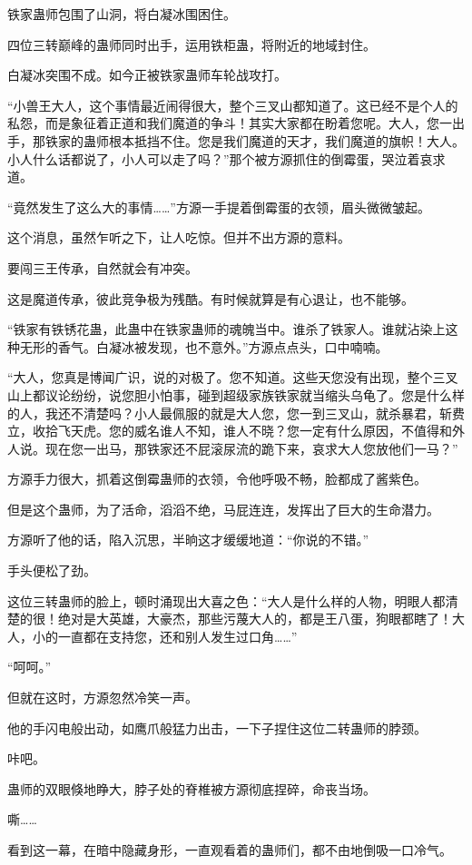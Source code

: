 \begin{this_body}
铁家蛊师包围了山洞，将白凝冰围困住。

四位三转巅峰的蛊师同时出手，运用铁柜蛊，将附近的地域封住。

白凝冰突围不成。如今正被铁家蛊师车轮战攻打。

“小兽王大人，这个事情最近闹得很大，整个三叉山都知道了。这已经不是个人的私怨，而是象征着正道和我们魔道的争斗！其实大家都在盼着您呢。大人，您一出手，那铁家的蛊师根本抵挡不住。您是我们魔道的天才，我们魔道的旗帜！大人。小人什么话都说了，小人可以走了吗？”那个被方源抓住的倒霉蛋，哭泣着哀求道。

“竟然发生了这么大的事情……”方源一手提着倒霉蛋的衣领，眉头微微皱起。

这个消息，虽然乍听之下，让人吃惊。但并不出方源的意料。

要闯三王传承，自然就会有冲突。

这是魔道传承，彼此竞争极为残酷。有时候就算是有心退让，也不能够。

“铁家有铁锈花蛊，此蛊中在铁家蛊师的魂魄当中。谁杀了铁家人。谁就沾染上这种无形的香气。白凝冰被发现，也不意外。”方源点点头，口中喃喃。

“大人，您真是博闻广识，说的对极了。您不知道。这些天您没有出现，整个三叉山上都议论纷纷，说您胆小怕事，碰到超级家族铁家就当缩头乌龟了。您是什么样的人，我还不清楚吗？小人最佩服的就是大人您，您一到三叉山，就杀暴君，斩费立，收拾飞天虎。您的威名谁人不知，谁人不晓？您一定有什么原因，不值得和外人说。现在您一出马，那铁家还不屁滚尿流的跪下来，哀求大人您放他们一马？”

方源手力很大，抓着这倒霉蛊师的衣领，令他呼吸不畅，脸都成了酱紫色。

但是这个蛊师，为了活命，滔滔不绝，马屁连连，发挥出了巨大的生命潜力。

方源听了他的话，陷入沉思，半晌这才缓缓地道：“你说的不错。”

手头便松了劲。

这位三转蛊师的脸上，顿时涌现出大喜之色：“大人是什么样的人物，明眼人都清楚的很！绝对是大英雄，大豪杰，那些污蔑大人的，都是王八蛋，狗眼都瞎了！大人，小的一直都在支持您，还和别人发生过口角……”

“呵呵。”

但就在这时，方源忽然冷笑一声。

他的手闪电般出动，如鹰爪般猛力出击，一下子捏住这位二转蛊师的脖颈。

咔吧。

蛊师的双眼倏地睁大，脖子处的脊椎被方源彻底捏碎，命丧当场。

嘶……

看到这一幕，在暗中隐藏身形，一直观看着的蛊师们，都不由地倒吸一口冷气。


\end{this_body}
